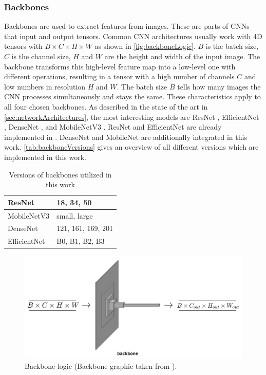 \subsubsection{Backbones}
\label{subsubsec:backbones}

Backbones are used to extract features from images.
These are parts of \ac{CNN}s that input and output tensors.
Common \ac{CNN} architectures usually work with 4D tensors with $B \times C \times H \times W$ as shown in \autoref{fig:backboneLogic}.
$B$ is the batch size, $C$ is the channel size, $H$ and $W$ are the height and width of the input image.
The backbone transforms this high-level feature map into a low-level one with different operations, resulting in a tensor with a high number of channels $C$ and low numbers in resolution $H$ and $W$.
The batch size $B$ tells how many images the \ac{CNN} processes simultaneously and stays the same.
These characteristics apply to all four chosen backbones.
As described in the state of the art in \autoref{sec:networkArchitectures}, the most interesting models are ResNet \cite{ResNet}, EfficientNet \cite{EfficientNet}, DenseNet \cite{DenseNets}, and MobileNetV3 \cite{MobileNetV3}.
ResNet and EfficientNet are already implemented in \cite{tepNet2024}.
DenseNet and MobileNet are additionally integrated in this work.
\autoref{tab:backboneVersions} gives an overview of all different versions which are implemented in this work.

\begin{table}[H]
    \centering
    \begin{tabular}{|l|l|}
        \hline
        ResNet & 18, 34, 50\\
        \hline
        MobileNetV3 & small, large\\
        \hline
        DenseNet & 121, 161, 169, 201\\
        \hline
        EfficientNet & B0, B1, B2, B3\\
        \hline
    \end{tabular}
    \caption{Versions of backbones utilized in this work}
    \label{tab:backboneVersions}
\end{table}

\begin{figure}[H]
    \centering
    \includegraphics[width=0.6\linewidth]{PICs/improvedModel/backbone_logic.jpg}
    \caption{Backbone logic (Backbone graphic taken from \cite{tepNet2024}).}
    \label{fig:backboneLogic}
\end{figure}

